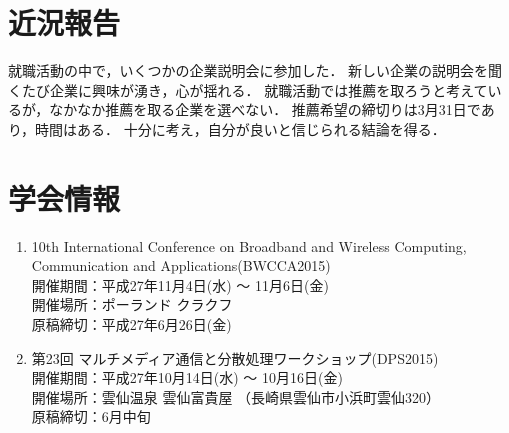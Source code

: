 \documentclass[fleqn, 12pt]{extarticlej}
\begin{document}
\section{近況報告}
就職活動の中で，いくつかの企業説明会に参加した．
新しい企業の説明会を聞くたび企業に興味が湧き，心が揺れる．
就職活動では推薦を取ろうと考えているが，なかなか推薦を取る企業を選べない．
推薦希望の締切りは3月31日であり，時間はある．
十分に考え，自分が良いと信じられる結論を得る．

\section{学会情報}
\begin{enumerate}
 \item 10th International Conference on Broadband and Wireless Computing, Communication and Applications(BWCCA2015)\\
       開催期間：平成27年11月4日(水) 〜 11月6日(金)\\
       開催場所：ポーランド クラクフ\\
       原稿締切：平成27年6月26日(金)
 \item 第23回 マルチメディア通信と分散処理ワークショップ(DPS2015)\\
       開催期間：平成27年10月14日(水) 〜 10月16日(金)\\
       開催場所：雲仙温泉 雲仙富貴屋 （長崎県雲仙市小浜町雲仙320）\\
       原稿締切：6月中旬
\end{enumerate}



\end{document}
